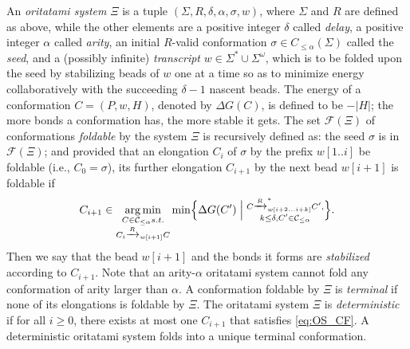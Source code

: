 \documentclass[twocolumn]{svjour3}
\DeclareMathOperator*{\argmin}{arg\,min}
\begin{document}
An \textit{oritatami system} $\Xi$ is a tuple $(\Sigma, R, \delta, \alpha, \sigma, w)$, where $\Sigma$ and $R$ are defined as above, while the other elements are
a positive integer $\delta$ called \textit{delay}, 
a positive integer $\alpha$ called \textit{arity},
an initial $R$-valid conformation $\sigma \in C_{\le \alpha}(\Sigma)$ called the \textit{seed},
and a (possibly infinite) \textit{transcript} $w \in \Sigma^* \cup \Sigma^\omega$, which is to be folded upon the seed by stabilizing beads of $w$ one at a time so as to minimize energy collaboratively with the succeeding $\delta{-}1$ nascent beads.
%
The energy of a conformation $C = (P, w, H)$, denoted by $\Delta G(C)$, is defined to be ${-}|H|$; the more bonds a conformation has, the more stable it gets. 
The set $\mathcal{F}(\Xi)$ of conformations \textit{foldable} by the system $\Xi$ is recursively defined as: the seed $\sigma$ is in $\mathcal{F}(\Xi)$; and provided that an elongation $C_i$ of $\sigma$ by the prefix $w[1..i]$ be foldable (i.e., $C_0 = \sigma$), its further elongation $C_{i+1}$ by the next bead $w[i+1]$ is foldable if 
\begin{equation}\label{eq:OS_CF}
C_{i+1} \in \argmin_{
\substack{
C \in \mathcal{C}_{\le \alpha} s.t. \\
C_i \xrightarrow{R}_{w[i+1]}C \\
}
}
\min \Bigl\{ \Delta G(C') \Bigm|
\substack{
C \xrightarrow{R}^*_{w[i+2...i+k]}C', \\
k\le \delta, C' \in \mathcal{C}_{\le \alpha}
}%
\Bigr\}.
\end{equation}
%
Then we say that the bead $w[i+1]$ and the bonds it forms are \textit{stabilized} according to $C_{i+1}$. 
Note that an arity-$\alpha$ oritatami system cannot fold any conformation of arity larger than $\alpha$. %
A conformation foldable by $\Xi$ is \textit{terminal} if none of its elongations is foldable by $\Xi$. 
The oritatami system $\Xi$ is \textit{deterministic} if for all $i \ge 0$, there exists at most one $C_{i+1}$ that satisfies \eqref{eq:OS_CF}. 
A deterministic oritatami system folds into a unique terminal conformation. 
\end{document}
